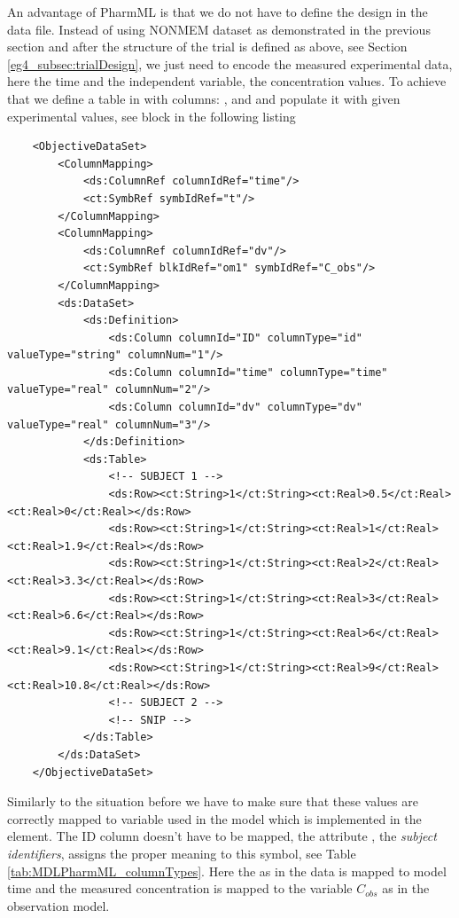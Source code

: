 An advantage of PharmML is that we do not have
to define the design in the data file. Instead of using NONMEM dataset as 
demonstrated in the previous section and after the structure of the trial is defined
as above, see Section \ref{eg4_subsec:trialDesign}, we just need to encode the 
measured experimental data, here the time and the independent variable, the 
concentration values. To achieve that we define a table in  with 
columns: ,  and  and populate it with given experimental 
values, see  block in the following listing 
\lstset{language=XML}
\begin{lstlisting}
    <ObjectiveDataSet>
        <ColumnMapping>
            <ds:ColumnRef columnIdRef="time"/>
            <ct:SymbRef symbIdRef="t"/>
        </ColumnMapping>
        <ColumnMapping>
            <ds:ColumnRef columnIdRef="dv"/>
            <ct:SymbRef blkIdRef="om1" symbIdRef="C_obs"/>
        </ColumnMapping>
        <ds:DataSet>
            <ds:Definition>
                <ds:Column columnId="ID" columnType="id" valueType="string" columnNum="1"/>
                <ds:Column columnId="time" columnType="time" valueType="real" columnNum="2"/>
                <ds:Column columnId="dv" columnType="dv" valueType="real" columnNum="3"/>
            </ds:Definition>
            <ds:Table>
                <!-- SUBJECT 1 -->
                <ds:Row><ct:String>1</ct:String><ct:Real>0.5</ct:Real><ct:Real>0</ct:Real></ds:Row>
                <ds:Row><ct:String>1</ct:String><ct:Real>1</ct:Real><ct:Real>1.9</ct:Real></ds:Row>
                <ds:Row><ct:String>1</ct:String><ct:Real>2</ct:Real><ct:Real>3.3</ct:Real></ds:Row>
                <ds:Row><ct:String>1</ct:String><ct:Real>3</ct:Real><ct:Real>6.6</ct:Real></ds:Row>
                <ds:Row><ct:String>1</ct:String><ct:Real>6</ct:Real><ct:Real>9.1</ct:Real></ds:Row>
                <ds:Row><ct:String>1</ct:String><ct:Real>9</ct:Real><ct:Real>10.8</ct:Real></ds:Row>
                <!-- SUBJECT 2 -->
                <!-- SNIP -->
            </ds:Table>
        </ds:DataSet>
    </ObjectiveDataSet>
\end{lstlisting}

Similarly to the situation before we have to make sure that these values are 
correctly mapped to variable used in the model which is implemented in the 
 element. The ID column doesn't have to be mapped, 
the attribute , the \emph{subject identifiers}, assigns the 
proper meaning to this symbol, see Table \ref{tab:MDLPharmML_columnTypes}. 
Here the  as in the data is mapped 
to model time  and the measured concentration is mapped to the 
variable $C_{obs}$ as in the observation model.


